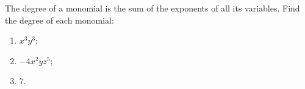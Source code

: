 The degree of a monomial is the sum of the exponents of all its variables. Find the degree of each monomial:
\begin{enumerate}
\item[(a)] $x^3y^3$;
\item[(b)] $-4x^2yz^5$;
\item[(c)] $7$.
\end{enumerate}
